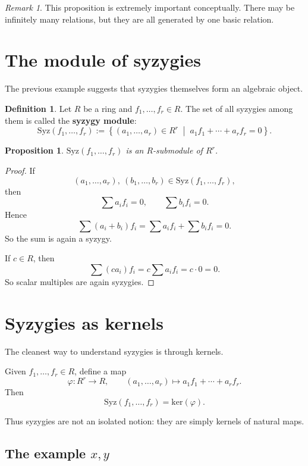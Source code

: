 \documentclass[11pt]{article}
\newtheorem{proposition}[theorem]{Proposition}
\theoremstyle{definition}
\newtheorem{definition}[theorem]{Definition}
\theoremstyle{remark}
\newtheorem{remark}[theorem]{Remark}
\newcommand{\Syz}{\mathrm{Syz}}
\newcommand{\kerR}{\mathrm{ker}}
\begin{document}
	\begin{remark}
		This proposition is extremely important conceptually. There may be infinitely many relations, but they are all generated by one basic relation.
	\end{remark}
	
	\section{The module of syzygies}
	
	The previous example suggests that syzygies themselves form an algebraic object.
	
	\begin{definition}
		Let \(R\) be a ring and \(f_1,\dots,f_r\in R\). The set of all syzygies among them is called the \textbf{syzygy module}:
		\[
		\Syz(f_1,\dots,f_r)
		:=
		\left\{
		(a_1,\dots,a_r)\in R^r \;\middle|\; a_1f_1+\cdots+a_rf_r=0
		\right\}.
		\]
	\end{definition}
	
	\begin{proposition}
		\(\Syz(f_1,\dots,f_r)\) is an \(R\)-submodule of \(R^r\).
	\end{proposition}
	
	\begin{proof}
		If
		\[
		(a_1,\dots,a_r),\ (b_1,\dots,b_r)\in \Syz(f_1,\dots,f_r),
		\]
		then
		\[
		\sum a_if_i=0,\qquad \sum b_if_i=0.
		\]
		Hence
		\[
		\sum (a_i+b_i)f_i = \sum a_if_i + \sum b_if_i = 0.
		\]
		So the sum is again a syzygy.
		
		If \(c\in R\), then
		\[
		\sum (ca_i)f_i = c\sum a_if_i = c\cdot 0 = 0.
		\]
		So scalar multiples are again syzygies.
	\end{proof}
	
	\section{Syzygies as kernels}
	
	The cleanest way to understand syzygies is through kernels.
	
	Given \(f_1,\dots,f_r\in R\), define a map
	\[
	\varphi:R^r\to R,\qquad
	(a_1,\dots,a_r)\mapsto a_1f_1+\cdots+a_rf_r.
	\]
	Then
	\[
	\Syz(f_1,\dots,f_r)=\kerR(\varphi).
	\]
	
	Thus syzygies are not an isolated notion: they are simply kernels of natural maps.
	
	\subsection{The example \(x,y\)}
	
\end{document}
